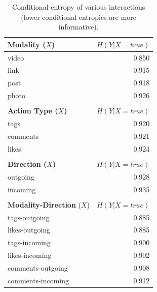 \begin{table}
\caption{Conditional entropy of various interactions (lower conditional
entropies are more informative).}
\label{table:ce_interaction}
\vspace{-2mm}
\centering
{\footnotesize
	\begin{tabular}{| >{\small}l | >{\small}r | }
		\hline
		\textbf{ Modality ($X$)} & $H(Y|X=true)$ \\
		\hline
		{ video } & 0.850 \\
		\hline
		{ link } & 0.915 \\
		\hline
		{ post } & 0.918 \\
		\hline
		{ photo } & 0.926 \\
		\hline
\multicolumn{2}{c}{}\\
		\hline
		\textbf{Action Type ($X$)}  & $H(Y|X=true)$ \\
		\hline
		{ tags }  &  0.920 \\
		\hline
		{ comments }  &  0.921 \\
		\hline
		{ likes }  &  0.924 \\
		\hline
\multicolumn{2}{c}{}\\
		\hline
		\textbf{ Direction ($X$) } & $H(Y|X=true)$ \\
		\hline
		{ outgoing }  &  0.928 \\
		\hline
		{ incoming }  &  0.935 \\
		\hline
\multicolumn{2}{c}{}\\
%	
		\hline
		\textbf{Modality-Direction} ($X$) & $H(Y|X=true)$ \\
		\hline
		tags-outgoing & 0.885 \\
		likes-outgoing & 0.885 \\
		tags-incoming & 0.900 \\
		likes-incoming & 0.902 \\
		comments-outgoing & 0.908 \\
		comments-incoming & 0.912 \\
		\hline

\end{tabular}}
\end{table}
